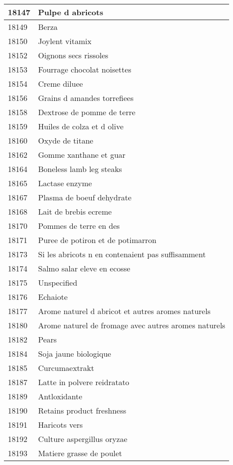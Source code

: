 \begin{longtable}{|l|l|}
18147 & Pulpe d abricots \\ \hline 
18149 & Berza \\ \hline 
18150 & Joylent vitamix \\ \hline 
18152 & Oignons secs rissoles \\ \hline 
18153 & Fourrage chocolat noisettes \\ \hline 
18154 & Creme diluee \\ \hline 
18156 & Grains d amandes torrefiees \\ \hline 
18158 & Dextrose de pomme de terre \\ \hline 
18159 & Huiles de colza et d olive \\ \hline 
18160 & Oxyde de titane \\ \hline 
18162 & Gomme xanthane et guar \\ \hline 
18164 & Boneless lamb leg steaks \\ \hline 
18165 & Lactase enzyme \\ \hline 
18167 & Plasma de boeuf dehydrate \\ \hline 
18168 & Lait de brebis ecreme \\ \hline 
18170 & Pommes de terre en des \\ \hline 
18171 & Puree de potiron et de potimarron \\ \hline 
18173 & Si les abricots n en contenaient pas suffisamment \\ \hline 
18174 & Salmo salar eleve en ecosse \\ \hline 
18175 & Unspecified \\ \hline 
18176 & Echaiote \\ \hline 
18177 & Arome naturel d abricot et autres aromes naturels \\ \hline 
18180 & Arome naturel de fromage avec autres aromes naturels \\ \hline 
18182 & Pears \\ \hline 
18184 & Soja jaune biologique \\ \hline 
18185 & Curcumaextrakt \\ \hline 
18187 & Latte in polvere reidratato \\ \hline 
18189 & Antloxidante \\ \hline 
18190 & Retains product freshness \\ \hline 
18191 & Haricots vers \\ \hline 
18192 & Culture aspergillus oryzae \\ \hline 
18193 & Matiere grasse de poulet \\ \hline 

\end{longtable}
